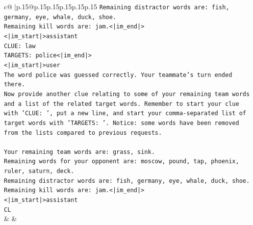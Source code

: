 \documentclass{article}
\begin{document}
{\begin{supertabular}{c@{$\;$}|p{.15\linewidth}@{}p{.15\linewidth}p{.15\linewidth}p{.15\linewidth}p{.15\linewidth}p{.15\linewidth}}
{{{\texttt{Remaining distractor words are: fish, germany, eye, whale, duck, shoe.} \\
\texttt{Remaining kill words are: jam.<|im\_end|>} \\
\texttt{<|im\_start|>assistant} \\
\texttt{CLUE: law} \\
\texttt{TARGETS: police<|im\_end|>} \\
\texttt{<|im\_start|>user} \\
\texttt{The word police was guessed correctly. Your teammate's turn ended there.} \\
\texttt{Now provide another clue relating to some of your remaining team words and a list of the related target words. Remember to start your clue with 'CLUE: ', put a new line, and start your comma{-}separated list of target words with 'TARGETS: '. Notice: some words have been removed from the lists compared to previous requests.} \\
\\ 
\texttt{Your remaining team words are: grass, sink.} \\
\texttt{Remaining words for your opponent are: moscow, pound, tap, phoenix, ruler, saturn, deck.} \\
\texttt{Remaining distractor words are: fish, germany, eye, whale, duck, shoe.} \\
\texttt{Remaining kill words are: jam.<|im\_end|>} \\
\texttt{<|im\_start|>assistant} \\
\texttt{CL} \\
            }
        }
    }
    & & \\ \\


\end{supertabular}}
\end{document}
